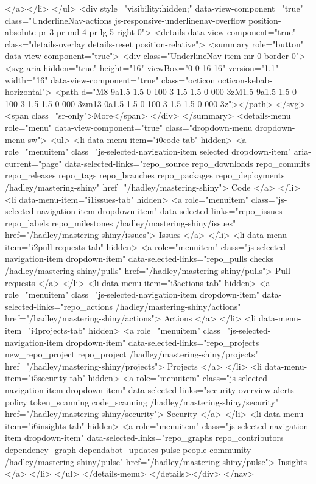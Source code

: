     
</a></li>
</ul>
    <div style="visibility:hidden;" data-view-component="true" class="UnderlineNav-actions js-responsive-underlinenav-overflow position-absolute pr-3 pr-md-4 pr-lg-5 right-0">      <details data-view-component="true" class="details-overlay details-reset position-relative">
  <summary role="button" data-view-component="true">          <div class="UnderlineNav-item mr-0 border-0">
            <svg aria-hidden="true" height="16" viewBox="0 0 16 16" version="1.1" width="16" data-view-component="true" class="octicon octicon-kebab-horizontal">
    <path d="M8 9a1.5 1.5 0 100-3 1.5 1.5 0 000 3zM1.5 9a1.5 1.5 0 100-3 1.5 1.5 0 000 3zm13 0a1.5 1.5 0 100-3 1.5 1.5 0 000 3z"></path>
</svg>
            <span class="sr-only">More</span>
          </div>
</summary>
  <details-menu role="menu" data-view-component="true" class="dropdown-menu dropdown-menu-sw">          <ul>
              <li data-menu-item="i0code-tab" hidden>
                <a role="menuitem" class="js-selected-navigation-item selected dropdown-item" aria-current="page" data-selected-links="repo_source repo_downloads repo_commits repo_releases repo_tags repo_branches repo_packages repo_deployments /hadley/mastering-shiny" href="/hadley/mastering-shiny">
                  Code
</a>              </li>
              <li data-menu-item="i1issues-tab" hidden>
                <a role="menuitem" class="js-selected-navigation-item dropdown-item" data-selected-links="repo_issues repo_labels repo_milestones /hadley/mastering-shiny/issues" href="/hadley/mastering-shiny/issues">
                  Issues
</a>              </li>
              <li data-menu-item="i2pull-requests-tab" hidden>
                <a role="menuitem" class="js-selected-navigation-item dropdown-item" data-selected-links="repo_pulls checks /hadley/mastering-shiny/pulls" href="/hadley/mastering-shiny/pulls">
                  Pull requests
</a>              </li>
              <li data-menu-item="i3actions-tab" hidden>
                <a role="menuitem" class="js-selected-navigation-item dropdown-item" data-selected-links="repo_actions /hadley/mastering-shiny/actions" href="/hadley/mastering-shiny/actions">
                  Actions
</a>              </li>
              <li data-menu-item="i4projects-tab" hidden>
                <a role="menuitem" class="js-selected-navigation-item dropdown-item" data-selected-links="repo_projects new_repo_project repo_project /hadley/mastering-shiny/projects" href="/hadley/mastering-shiny/projects">
                  Projects
</a>              </li>
              <li data-menu-item="i5security-tab" hidden>
                <a role="menuitem" class="js-selected-navigation-item dropdown-item" data-selected-links="security overview alerts policy token_scanning code_scanning /hadley/mastering-shiny/security" href="/hadley/mastering-shiny/security">
                  Security
</a>              </li>
              <li data-menu-item="i6insights-tab" hidden>
                <a role="menuitem" class="js-selected-navigation-item dropdown-item" data-selected-links="repo_graphs repo_contributors dependency_graph dependabot_updates pulse people community /hadley/mastering-shiny/pulse" href="/hadley/mastering-shiny/pulse">
                  Insights
</a>              </li>
          </ul>
</details-menu>
</details></div>
</nav>

